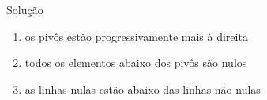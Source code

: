 \begin{resolutiont}{Solução}
\onslide<+->{\[
  C = \begin{bmatrix}
    0 & 1 & 3 \\
    0 & 0 & 2 \\
    0 & 0 & 0
  \end{bmatrix}
\]}
\begin{enumerate}[<+->]
  \item os pivôs estão progressivamente mais à direita
  \item todos os elementos abaixo dos pivôs são nulos
  \item as linhas nulas estão abaixo das linhas não nulas
\end{enumerate}
\end{resolutiont}


